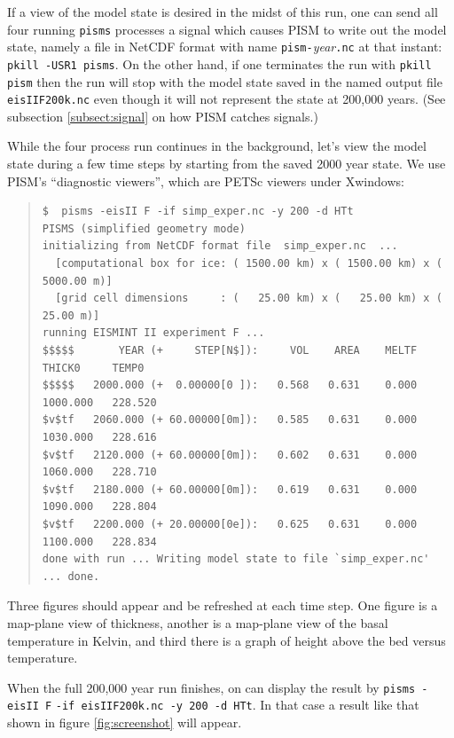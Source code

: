 \documentclass[11pt,final]{amsart}
\begin{document}
If a view of the model state is desired in the midst of this run, one can send all four running \verb|pisms| processes a signal which causes PISM to write out the model state, namely a file in NetCDF format with name \verb|pism-|\emph{year}\verb|.nc| at that instant: \verb|pkill -USR1 pisms|.  On the other hand, if one terminates the run with \verb|pkill pism| then the run will stop with the model state saved in the named output file \verb|eisIIF200k.nc| even though it will not represent the state at 200,000 years.  (See subsection \ref{subsect:signal} on how PISM catches signals.)

While the four process run continues in the background, let's view the model state during a few time steps by starting from the saved 2000 year state.  We use PISM's ``diagnostic viewers'', which are PETSc viewers under Xwindows:

\small\begin{quote}\begin{verbatim}
$  pisms -eisII F -if simp_exper.nc -y 200 -d HTt
PISMS (simplified geometry mode)
initializing from NetCDF format file  simp_exper.nc  ...
  [computational box for ice: ( 1500.00 km) x ( 1500.00 km) x ( 5000.00 m)]
  [grid cell dimensions     : (   25.00 km) x (   25.00 km) x (   25.00 m)]
running EISMINT II experiment F ...
$$$$$       YEAR (+     STEP[N$]):     VOL    AREA    MELTF     THICK0     TEMP0
$$$$$   2000.000 (+  0.00000[0 ]):   0.568   0.631    0.000   1000.000   228.520
$v$tf   2060.000 (+ 60.00000[0m]):   0.585   0.631    0.000   1030.000   228.616
$v$tf   2120.000 (+ 60.00000[0m]):   0.602   0.631    0.000   1060.000   228.710
$v$tf   2180.000 (+ 60.00000[0m]):   0.619   0.631    0.000   1090.000   228.804
$v$tf   2200.000 (+ 20.00000[0e]):   0.625   0.631    0.000   1100.000   228.834
done with run ... Writing model state to file `simp_exper.nc' ... done.
\end{verbatim}
\end{quote}\normalsize

Three figures should appear and be refreshed at each time step.  One figure is a map-plane view of thickness, another is a map-plane view of the basal temperature in Kelvin, and third there is a graph of height above the bed versus temperature.  

When the full 200,000 year run finishes, on can display the result by \verb|pisms -eisII F| \verb|-if eisIIF200k.nc -y 200 -d HTt|.  In that case a result like that shown in figure \ref{fig:screenshot} will appear.
\medskip
\end{document}
